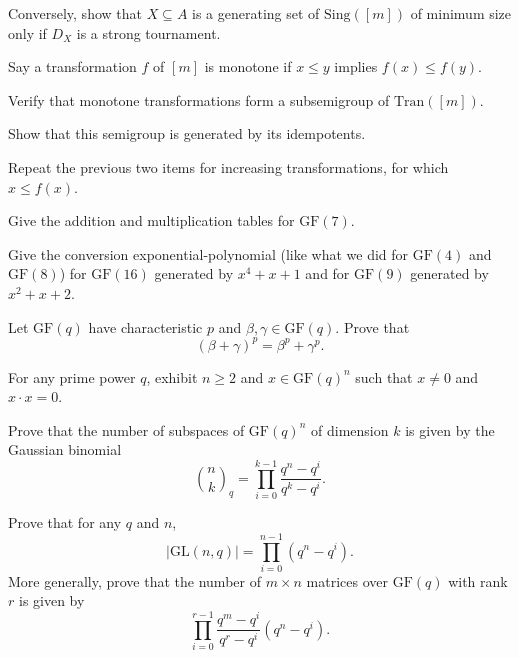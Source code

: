 \documentclass[a4paper, 11pt]{book}
\numberwithin{equation}{section}
\theoremstyle{plain}
\newcommand{\GF}{\mathrm{GF}}
\newcommand{\Tran}{\mathrm{Tran}}
\newcommand{\Sing}{\mathrm{Sing}}
\newcommand{\GL}{\mathrm{GL}}
\renewcommand{\(}{\ldbrack}
\renewcommand{\)}{\rdbrack}
\begin{document}
\begin{exercises}
\begin{exercises}
	\item Conversely, show that $X \subseteq A$ is a generating set of $\Sing([m])$ of minimum size only if $D_X$ is a strong tournament.
\end{exercises}

\item Say a transformation $f$ of $[m]$ is monotone if $x \le y$ implies $f(x) \le f(y)$.
\begin{exercises}
	\item Verify that monotone transformations form a subsemigroup of $\Tran([m])$.
	
	\item Show that this semigroup is generated by its idempotents.
	
	\item Repeat the previous two items for increasing transformations, for which $x \le f(x)$.
\end{exercises}






\item Give the addition and multiplication tables for $\GF(7)$.

\item Give the conversion exponential-polynomial (like what we did for $\GF(4)$ and $\GF(8)$) for $\GF(16)$ generated by $x^4 + x + 1$ and for $\GF(9)$ generated by $x^2 + x + 2$.

\item Let $\GF(q)$ have characteristic $p$ and $\beta, \gamma \in \GF(q)$. Prove that
\[
	(\beta + \gamma)^p = \beta^p + \gamma^p.
\]

\item For any prime power $q$, exhibit $n \ge 2$ and $x \in \GF(q)^n$ such that $x \ne 0$ and $x \cdot x = 0$.

\item Prove that the number of subspaces of $\GF(q)^n$ of dimension $k$ is given by the Gaussian binomial
\[
	\binom{n}{k}_q = \prod_{i=0}^{k-1} \frac{ q^n - q^i }{ q^k - q^i }.
\]

\item \label{exerc:GL} Prove that for any $q$ and $n$,
\[
	|\GL(n,q)| = \prod_{i=0}^{n-1} (q^n -q^i).
\]
More generally, prove that the number of $m \times n$ matrices over $\GF(q)$ with rank $r$ is given by
\[
	\prod_{i=0}^{r-1} \frac{q^m - q^i}{q^r - q^i} (q^n - q^i).
\]







\end{exercises}
\end{document}
